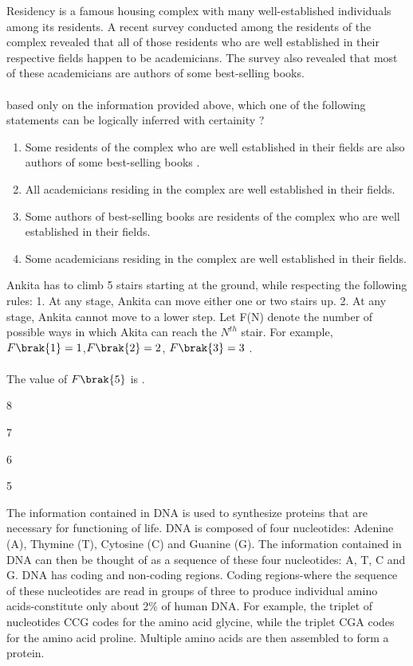 \item %
Residency is a famous housing complex with many well-established individuals among its residents. A recent survey conducted among the residents of the complex revealed that all of those residents who are well established in their respective fields happen to be academicians. The survey also revealed that most of these academicians are authors of some best-selling books. \\
\\
based only on the information provided above, which one of the following statements can be logically inferred with certainity ?
\begin{enumerate}
\item Some residents of the complex who are well established in their fields are also authors of some best-selling books .
\item All academicians residing in the complex are well established in their fields.
\item Some authors of best-selling books are residents of the complex who are well established in their fields.
\item Some academicians residing in the complex are well established in their fields.
\end{enumerate}
\item %
Ankita has to climb 5 stairs starting at the ground, while respecting the following rules:
1. At any stage, Ankita can move either one or two stairs up.
2. At any stage, Ankita cannot move to a lower step.
Let F(N) denote the number of possible ways in which Akita can reach the $N^{th}$ stair. For example, $F\brak{1}=1$,$F\brak{2}=2$, $F\brak{3}=3$ . \\
\\
The value of $F\brak{5}$ is \underline{\hspace{1.5cm}} .
\begin{enumerate}
\begin{multicols}{4}
\item 8
\item 7
\item 6
\item 5
\end{multicols}
\end{enumerate}
\item %
The information contained in DNA is used to synthesize proteins that are necessary for functioning of life. DNA is composed of four nucleotides: Adenine (A), Thymine (T), Cytosine (C) and Guanine (G). The information contained in DNA can then be thought of as a sequence of these four nucleotides: A, T, C and G. DNA has coding and non-coding regions. Coding regions-where the sequence of these nucleotides are read in groups of three to produce individual amino acids-constitute only about 2\% of human DNA. For example, the triplet of nucleotides CCG codes for the amino acid glycine, while the triplet CGA codes for the amino acid proline. Multiple amino acids are then assembled to form a protein. \\
